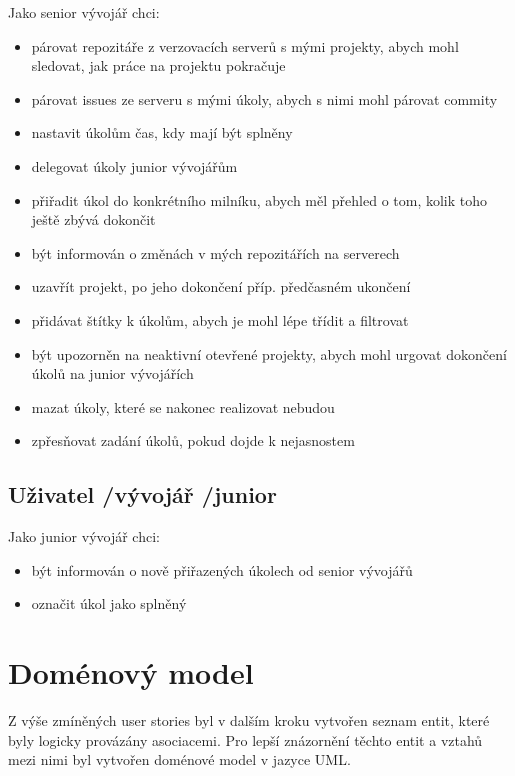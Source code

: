 Jako senior vývojář chci: 

\begin{itemize}
\item párovat repozitáře z verzovacích serverů s mými projekty, abych mohl sledovat, jak práce na projektu pokračuje
\item párovat issues ze serveru s mými úkoly, abych s nimi mohl párovat commity
\item nastavit úkolům čas, kdy mají být splněny
\item delegovat úkoly junior vývojářům
\item přiřadit úkol do konkrétního milníku, abych měl přehled o tom, kolik toho ještě zbývá dokončit
\item být informován o změnách v mých repozitářích na serverech
\item uzavřít projekt, po jeho dokončení příp. předčasném ukončení
\item přidávat štítky k úkolům, abych je mohl lépe třídit a filtrovat
\item být upozorněn na neaktivní otevřené projekty, abych mohl urgovat dokončení úkolů na junior vývojářích
\item mazat úkoly, které se nakonec realizovat nebudou
\item zpřesňovat zadání úkolů, pokud dojde k nejasnostem
\end{itemize}

\subsection{Uživatel \slash  vývojář \slash  junior}

Jako junior vývojář chci:

\begin{itemize}
\item být informován o nově přiřazených úkolech od senior vývojářů
\item označit úkol jako splněný
\end{itemize}

\section{Doménový model}
Z výše zmíněných user stories byl v dalším kroku vytvořen seznam entit, které byly logicky provázány asociacemi. Pro lepší znázornění těchto entit a vztahů mezi nimi byl vytvořen doménové model v jazyce UML.

